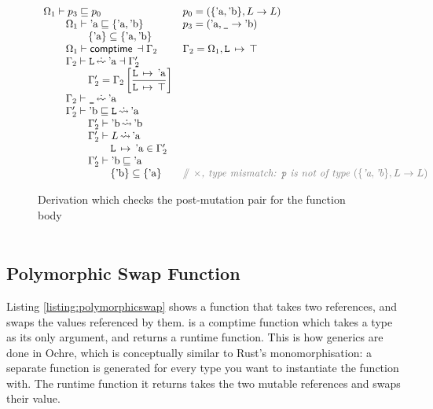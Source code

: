 \documentclass[12pt,twoside]{report}
\begin{document}
\begin{figure}
  \[\begin{array}{ll}
    \Omega_1 \vdash p_3 \subtype p_0 &
      p_0 = (\{\atom{a}, \atom{b}\}, L \rightarrow L) \\
    \otab \Omega_1 \vdash \atom{a} \subtype \{\atom{a}, \atom{b}\} &
      p_3 = (\atom{a}, \mono{\_} \rightarrow \atom{b}) \\
    \otab\otab \{\atom{a}\} \subseteq \{\atom{a}, \atom{b}\} \\
    \otab \Omega_1 \vdash \comptime{} \dashv \Gamma_2 &
      \Gamma_2 = \Omega_1,\absmapm{L}{\top} \\
    \otab \Gamma_2 \vdash \mono{L} \erasedwritearrow \atom{a} \dashv \Gamma_2' \\
    \otab\otab \Gamma_2' = \Gamma_2\left[\dfrac{\absmapm{L}{\atom{a}}}{\absmapm{L}{\top}}\right] \\
    \otab \Gamma_2 \vdash \mono{\_} \erasedwritearrow \atom{a} \\
    \otab \Gamma_2' \vdash \atom{b} \subtype \mono{L} \erasedreadarrow \atom{a} \\
    \otab\otab \Gamma_2' \vdash \atom{b} \erasedreadarrow \atom{b} \\
    \otab\otab \Gamma_2' \vdash L \erasedreadarrow \atom{a} \\
    \otab\otab\otab \absmapm{L}{\atom{a}} \in \Gamma_2' \\
    \otab\otab \Gamma_2' \vdash \atom{b} \subtype \atom{a} \\
    \otab\otab\otab \{\atom{b}\} \subseteq \{\atom{a}\} &
      \ocomment{$\times$, type mismatch: \mono{p} is not of type $(\{\atom{a}, \atom{b}\}, L \rightarrow L)$} \\
  \end{array}\]
  \caption{Derivation which checks the post-mutation pair for the  function body}
  \label{fig:incorrectpairmutation}
\end{figure}

\begin{adjustwidth}{0cm}{0cm}
\smaller
\[\begin{array}{ll}

\end{array}\]
\end{adjustwidth}

\subsection{Polymorphic Swap Function}
Listing \ref{listing:polymorphicswap} shows a function that takes two references, and swaps the values referenced by them.  is a comptime function which takes a type  as its only argument, and returns a runtime function. This is how generics are done in Ochre, which is conceptually similar to Rust's monomorphisation: a separate function is generated for every type you want to instantiate the function with. The runtime function it returns takes the two mutable references and swaps their value.
\end{document}

